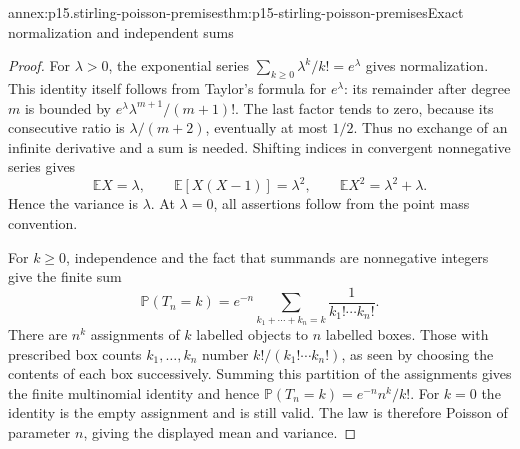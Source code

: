 \begin{annexitem}{annex:p15.stirling-poisson-premises}{thm:p15-stirling-poisson-premises}{Exact normalization and independent sums}
\begin{proof}
For \(\lambda>0\), the exponential series
\(\sum_{k\geq0}\lambda^k/k!=e^\lambda\) gives normalization.
This identity itself follows from Taylor's formula for
\(e^\lambda\): its remainder after degree \(m\) is bounded
by \(e^\lambda\lambda^{m+1}/(m+1)!\).
The last factor tends to zero, because its consecutive
ratio is \(\lambda/(m+2)\), eventually at most \(1/2\).
Thus no exchange of an infinite derivative and a sum is
needed. Shifting indices in convergent nonnegative series gives
\[
 \mathbb EX=\lambda,\qquad
 \mathbb E[X(X-1)]=\lambda^2,\qquad
 \mathbb EX^2=\lambda^2+\lambda.
\]
Hence the variance is \(\lambda\).
At \(\lambda=0\), all assertions follow from the point
mass convention.

For \(k\geq0\), independence and the fact that summands
are nonnegative integers give the finite sum
\[
 \mathbb P(T_n=k)
     =e^{-n}\sum_{k_1+\cdots+k_n=k}\frac1{k_1!\cdots k_n!}.
\]
There are \(n^k\) assignments of \(k\) labelled objects
to \(n\) labelled boxes. Those with prescribed box counts
\(k_1,\ldots,k_n\) number \(k!/(k_1!\cdots k_n!)\),
as seen by choosing the contents of each box successively.
Summing this partition of the assignments gives the
finite multinomial identity and hence
\(\mathbb P(T_n=k)=e^{-n}n^k/k!\).
For \(k=0\) the identity is the empty assignment and is
still valid. The law is therefore Poisson of parameter
\(n\), giving the displayed mean and variance.
\end{proof}
\end{annexitem}

